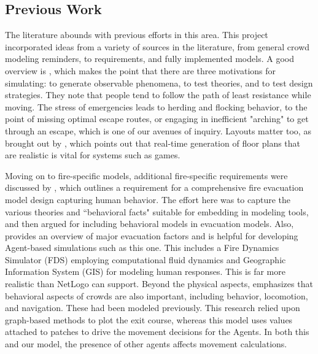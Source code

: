 \documentclass[12pt,letterpaper]{article}
\begin{document}
 
\subsection{Previous Work}
The literature abounds with previous efforts in this area. This project incorporated ideas from a variety of sources in the literature, from general crowd modeling reminders, to requirements, and fully implemented models. A good overview is \cite{almeidaCrowdSimulationModeling2013}, which makes the point that there are three motivations for simulating: to generate observable phenomena, to test theories, and to test design strategies. They note that people tend to follow the path of least resistance while moving. The stress of emergencies leads to herding and flocking behavior, to the point of missing optimal escape routes, or engaging in inefficient "arching" to get through an escape, which is one of our avenues of inquiry. Layouts matter too, as brought out by \cite{mirahmadiNovelAlgorithmRealtime2012}, which points out that real-time generation of floor plans that are realistic is vital for systems such as  games.


Moving on to fire-specific models, additional fire-specific requirements were discussed by \cite{kuligowskil}, which outlines a requirement for a comprehensive fire evacuation model design capturing human behavior. The effort here was to capture the various theories and ``behavioral facts" suitable for embedding in modeling tools, and then argued for including behavioral models in evacuation models. Also, \cite{abmEvac} provides an overview of major evacuation factors and is helpful for developing Agent-based simulations such as this one. This includes a Fire Dynamics Simulator (FDS) employing computational fluid dynamics and Geographic Information System (GIS) for modeling human responses. This is far more realistic than NetLogo can support. Beyond the physical aspects, \cite{kneidl} emphasizes that behavioral aspects of crowds are also important, including behavior, locomotion, and navigation. These had been modeled previously. This research relied upon graph-based methods to plot the exit course, whereas this model uses values attached to patches to drive the movement decisions for the Agents. In both this and our model, the presence of other agents affects movement calculations.
\end{document}
